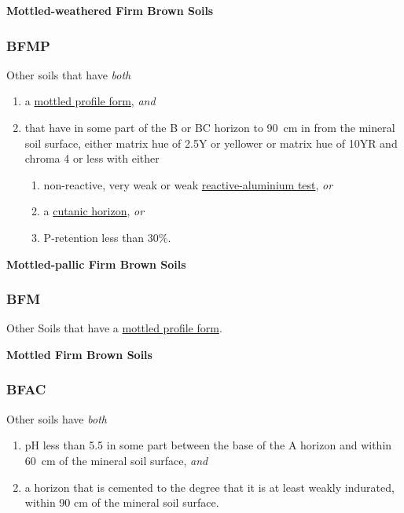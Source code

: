 \documentclass[
  letterpaper,
  DIV=11,
  numbers=noendperiod]{scrreprt}
\providecommand{\tightlist}{%
  \setlength{\itemsep}{0pt}\setlength{\parskip}{0pt}}\usepackage{longtable,booktabs,array}
\begin{document}
\textbf{Mottled-weathered Firm Brown Soils}

\hypertarget{sec-key-BFMP}{%
\subsubsection{\texorpdfstring{\textbf{BFMP}}{BFMP}}\label{sec-key-BFMP}}

Other soils that have \emph{both}

\begin{enumerate}
\def\labelenumi{\arabic{enumi}.}
\tightlist
\item
  a \protect\hyperlink{sec-diag-mottpf}{mottled profile form},
  \emph{and}
\item
  that have in some part of the B or BC horizon to 90~cm in from the
  mineral soil surface, either matrix hue of 2.5Y or yellower or matrix
  hue of 10YR and chroma 4 or less with either

  \begin{enumerate}
  \def\labelenumii{(\alph{enumii})}
  \tightlist
  \item
    non-reactive, very weak or weak
    \protect\hyperlink{sec-diag-naf}{reactive-aluminium test}, \emph{or}
  \item
    a \protect\hyperlink{sec-diag-cuth}{cutanic horizon}, \emph{or}
  \item
    P-retention less than 30\%.
  \end{enumerate}
\end{enumerate}

\textbf{Mottled-pallic Firm Brown Soils}

\hypertarget{sec-key-BFM}{%
\subsubsection{\texorpdfstring{\textbf{BFM}}{BFM}}\label{sec-key-BFM}}

Other Soils that have a \protect\hyperlink{sec-diag-mottpf}{mottled
profile form}.

\textbf{Mottled Firm Brown Soils}

\hypertarget{sec-key-BFAC}{%
\subsubsection{\texorpdfstring{\textbf{BFAC}}{BFAC}}\label{sec-key-BFAC}}

Other soils have \emph{both}

\begin{enumerate}
\def\labelenumi{\arabic{enumi}.}
\tightlist
\item
  pH less than 5.5 in some part between the base of the A horizon and
  within 60~cm of the mineral soil surface, \emph{and}
\item
  a horizon that is cemented to the degree that it is at least weakly
  indurated, within 90 cm of the mineral soil surface.
\end{enumerate}
\end{document}

